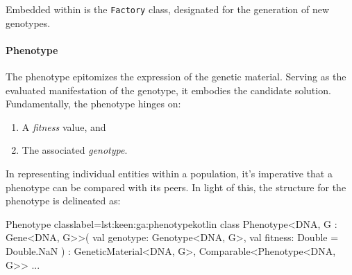     Embedded within is the \texttt{Factory} class, designated for the 
    generation of new genotypes.

  \paragraph{Phenotype}
    The phenotype epitomizes the expression of the genetic material.
    Serving as the evaluated manifestation of the genotype, it embodies the 
    candidate solution.
    Fundamentally, the phenotype hinges on:
    \begin{enumerate}
        \item A \textit{fitness} value, and
        \item The associated \textit{genotype}.
    \end{enumerate}
    
    In representing individual entities within a population, it's imperative 
    that a phenotype can be compared with its peers. 
    In light of this, the structure for the phenotype is delineated as:
    
    \begin{code}{Phenotype class}{label={lst:keen:ga:phenotype}}{kotlin}
      class Phenotype<DNA, G : Gene<DNA, G>>(
          val genotype: Genotype<DNA, G>,
          val fitness: Double = Double.NaN
      ) : GeneticMaterial<DNA, G>, Comparable<Phenotype<DNA, G>> { ... }
    \end{code}